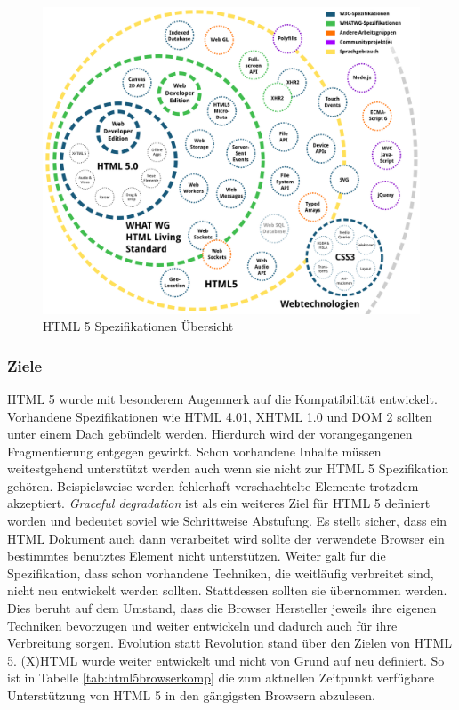 \vspace{1em}
\begin{figure}[htb]
  \centering
  \includegraphics[width=0.75\linewidth]{abb/html5_specs}
  \caption[HTML 5 Spezifikationen Übersicht]{HTML 5 Spezifikationen Übersicht \cite{PeteKroe2014}}
  \label{fig:html5specs}
\end{figure}

\subsubsection{Ziele} HTML 5 wurde mit besonderem Augenmerk auf die Kompatibilität entwickelt. Vorhandene Spezifikationen wie HTML 4.01, XHTML 1.0 und DOM 2 sollten unter einem Dach gebündelt werden. Hierdurch wird der vorangegangenen Fragmentierung entgegen gewirkt. Schon vorhandene Inhalte müssen weitestgehend unterstützt werden auch wenn sie nicht zur HTML 5 Spezifikation gehören. Beispielsweise werden fehlerhaft verschachtelte Elemente trotzdem akzeptiert. \textit{Graceful degradation} ist als ein weiteres Ziel für HTML 5 definiert worden und bedeutet soviel wie \glqq Schrittweise Abstufung\grqq{}. Es stellt sicher, dass ein HTML Dokument auch dann verarbeitet wird sollte der verwendete Browser ein bestimmtes benutztes Element nicht unterstützen. Weiter galt für die Spezifikation, dass schon vorhandene Techniken, die weitläufig verbreitet sind, nicht neu entwickelt werden sollten. Stattdessen sollten sie übernommen werden. Dies beruht auf dem Umstand, dass die Browser Hersteller jeweils ihre eigenen Techniken bevorzugen und weiter entwickeln und dadurch auch für ihre Verbreitung sorgen. Evolution statt Revolution stand über den Zielen von HTML 5. (X)HTML wurde weiter entwickelt und nicht von Grund auf neu definiert. So ist in Tabelle \ref{tab:html5browserkomp} die zum aktuellen Zeitpunkt verfügbare Unterstützung von HTML 5 in den gängigsten Browsern abzulesen.

